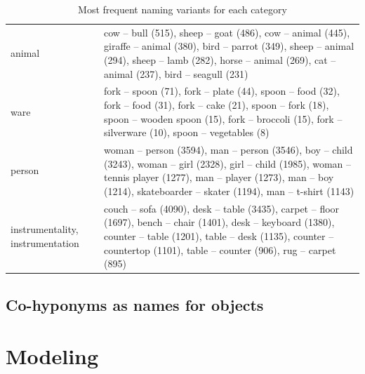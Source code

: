 \documentclass[11pt,a4paper]{article}
\begin{document}
\begin{table}
\begin{tabular}{lp{12cm}}
 animal &  cow -- bull (515), sheep -- goat (486), cow -- animal (445), giraffe -- animal (380), bird -- parrot (349), sheep -- animal (294), sheep -- lamb (282), horse -- animal (269), cat -- animal (237), bird -- seagull (231) \\
 ware &  fork -- spoon (71), fork -- plate (44), spoon -- food (32), fork -- food (31), fork -- cake (21), spoon -- fork (18), spoon -- wooden spoon (15), fork -- broccoli (15), fork -- silverware (10), spoon -- vegetables (8) \\
 person &  woman -- person (3594), man -- person (3546), boy -- child (3243), woman -- girl (2328), girl -- child (1985), woman -- tennis player (1277), man -- player (1273), man -- boy (1214), skateboarder -- skater (1194), man -- t-shirt (1143) \\
 instrumentality, instrumentation &  couch -- sofa (4090), desk -- table (3435), carpet -- floor (1697), bench -- chair (1401), desk -- keyboard (1380), counter -- table (1201), table -- desk (1135), counter -- countertop (1101), table -- counter (906), rug -- carpet (895) \\
\bottomrule
\end{tabular}\caption{Most frequent naming variants for each category}
\label{tab:exvariants}
\end{table}


\subsection{Co-hyponyms as names for objects}


\section{Modeling}

\end{document}
